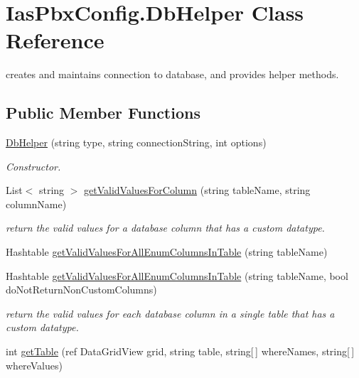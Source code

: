 \hypertarget{class_ias_pbx_config_1_1_db_helper}{
\section{IasPbxConfig.DbHelper Class Reference}
\label{class_ias_pbx_config_1_1_db_helper}
}


creates and maintains connection to database, and provides helper methods.  
\subsection*{Public Member Functions}
\begin{DoxyCompactItemize}
\item 
\hyperlink{class_ias_pbx_config_1_1_db_helper_a89a1108a7133811930d8a20f0c53909d}{DbHelper} (string type, string connectionString, int options)
\begin{DoxyCompactList}\small\item\em Constructor. \item\end{DoxyCompactList}\item 
List$<$ string $>$ \hyperlink{class_ias_pbx_config_1_1_db_helper_a1f1f49a5678367e1ebe7552e51627642}{getValidValuesForColumn} (string tableName, string columnName)
\begin{DoxyCompactList}\small\item\em return the valid values for a database column that has a custom datatype. \item\end{DoxyCompactList}\item 
Hashtable \hyperlink{class_ias_pbx_config_1_1_db_helper_ac35315fd4d2d96439ae8efcc4150aa80}{getValidValuesForAllEnumColumnsInTable} (string tableName)
\item 
Hashtable \hyperlink{class_ias_pbx_config_1_1_db_helper_a5f9ac6d60871e936168cc8c00ed2eb90}{getValidValuesForAllEnumColumnsInTable} (string tableName, bool doNotReturnNonCustomColumns)
\begin{DoxyCompactList}\small\item\em return the valid values for each database column in a single table that has a custom datatype. \item\end{DoxyCompactList}\item 
int \hyperlink{class_ias_pbx_config_1_1_db_helper_ab796d249ab48e0f89248fd41891f1763}{getTable} (ref DataGridView grid, string table, string\mbox{[}$\,$\mbox{]} whereNames, string\mbox{[}$\,$\mbox{]} whereValues)

\end{DoxyCompactItemize}
